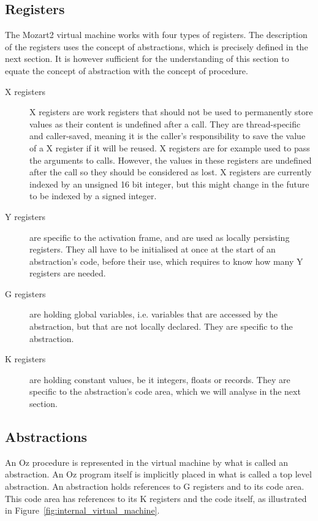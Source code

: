 \documentclass[a4paper]{memoir}
\begin{document}
\subsection{Registers}\label{sec:intro:registers}
The Mozart2 virtual machine works with four types of registers. The description of the registers uses the concept of abstractions, which is precisely defined in the next section. It is however sufficient for the understanding of this section to equate the concept of abstraction with the concept of procedure.
\begin{description}
  \item[X registers]X registers are work registers that should not be used to permanently
    store values as their content is undefined after a call. They are thread-specific and caller-saved, meaning it is the
    caller's responsibility to save the value of a X register if it will be
    reused.  X registers are for example used to pass the arguments to calls. However, the values in these registers are undefined after the call so they should be considered as lost. X registers are currently indexed by an unsigned 16 bit integer, but this might change in the future to be indexed by a signed integer.
  \item[Y registers]are specific to the activation frame, and are used as locally persisting registers. They all have to be initialised at once at the start of an abstraction's code, before their use, which requires to know how many Y registers are needed.
  \item[G registers] are holding global variables, i.e. variables that are
    accessed by the abstraction, but that are not locally declared. They are
    specific to the abstraction.
  \item[K registers] are holding constant values, be it integers, floats or
    records. They are specific to the abstraction's code area, which we will analyse in the
    next section.
\end{description}

\subsection{Abstractions}\label{sec:vm:abstractions}
An Oz procedure is represented in the virtual machine by what is called an abstraction. An Oz program itself is implicitly placed in what is called a top level abstraction.
An abstraction holds references to G registers and to its code area. This code
area has references to its K registers and the code itself, as illustrated in
Figure~\ref{fig:internal_virtual_machine}.
\end{document}

